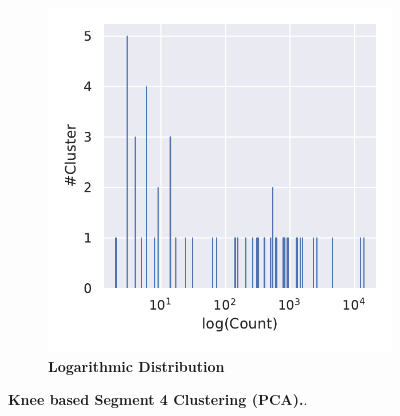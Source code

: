 \begin{figure}
\begin{subfigure}[b]{0.475\textwidth}
    \end{subfigure}
    \hfill
    \begin{subfigure}[b]{0.475\textwidth}
        \caption[Logarithmic Distribution]{\textbf{Logarithmic Distribution}}
        \label{subfig:PCA_Cluster_Knee_Distribution_log_4}            \includegraphics[width=\textwidth]{PCA/Cluster_Distribution_Log_Segment_4.pdf}
    \end{subfigure}
    \caption[Knee based Segment 4 Clustering (\Acrshort{PCA})]{\textbf{Knee based Segment 4 Clustering (\Acrshort{PCA}).}.}
    \label{fig:PCA_Cluster_Knee_4}
\end{figure}

